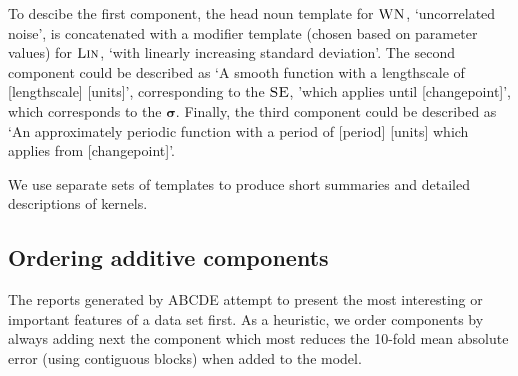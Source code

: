 \documentclass[letterpaper]{article}
\def\eg{e.g.\ }
\newcommand{\procedurename}{ABCDE}
\begin{document}
To descibe the first component, the head noun template for ${\textsc{WN}}$, `uncorrelated noise', is concatenated with a modifier template (chosen based on parameter values) for ${\textsc{Lin}}$, `with linearly increasing standard deviation'.
%
The second component could be described as `A smooth function with a lengthscale of [lengthscale] [units]', corresponding to the ${\textsc{SE}}$, 'which applies until [changepoint]', which corresponds to the $\boldsymbol{\sigma}$.
%
Finally, the third component could be described as `An approximately periodic function with a period of [period] [units] which applies from [changepoint]'.



We use separate sets of templates to produce short summaries and detailed descriptions of kernels.

\subsection{Ordering additive components}

The reports generated by \procedurename{} attempt to present the most interesting or important features of a data set first.
As a heuristic, we order components by always adding next the component which most reduces the 10-fold mean absolute error (using contiguous blocks) when added to the model.



\end{document}
